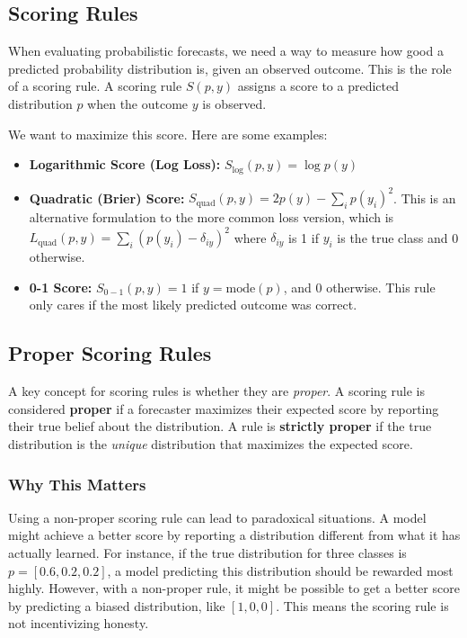 \documentclass{article}
\begin{document}
\begin{multicols}{2}
	\section{Scoring Rules}
	When evaluating probabilistic forecasts, we need a way to measure how good a predicted probability distribution is, given an observed outcome. This is the role of a scoring rule. A scoring rule $S(p, y)$ assigns a score to a predicted distribution $p$ when the outcome $y$ is observed.

	We want to maximize this score. Here are some examples:
	\begin{itemize}
		\item \textbf{Logarithmic Score (Log Loss):} $S_{\text{log}}(p, y) = \log p(y)$
		\item \textbf{Quadratic (Brier) Score:} $S_{\text{quad}}(p, y) = 2p(y) - \sum_{i} p(y_i)^2$. This is an alternative formulation to the more common loss version, which is $L_{\text{quad}}(p, y) = \sum_{i} (p(y_i) - \delta_{iy})^2$ where $\delta_{iy}$ is 1 if $y_i$ is the true class and 0 otherwise.
		\item \textbf{0-1 Score:} $S_{0-1}(p, y) = 1$ if $y = \text{mode}(p)$, and 0 otherwise. This rule only cares if the most likely predicted outcome was correct.
	\end{itemize}

	\subsection{Proper Scoring Rules}
	A key concept for scoring rules is whether they are \textit{proper}. A scoring rule is considered \textbf{proper} if a forecaster maximizes their expected score by reporting their true belief about the distribution. A rule is \textbf{strictly proper} if the true distribution is the \textit{unique} distribution that maximizes the expected score.

	\subsubsection{Why This Matters}
	Using a non-proper scoring rule can lead to paradoxical situations. A model might achieve a better score by reporting a distribution different from what it has actually learned. For instance, if the true distribution for three classes is $p = [0.6, 0.2, 0.2]$, a model predicting this distribution should be rewarded most highly. However, with a non-proper rule, it might be possible to get a better score by predicting a biased distribution, like $[1, 0, 0]$. This means the scoring rule is not incentivizing honesty.


\end{multicols}
\end{document}
